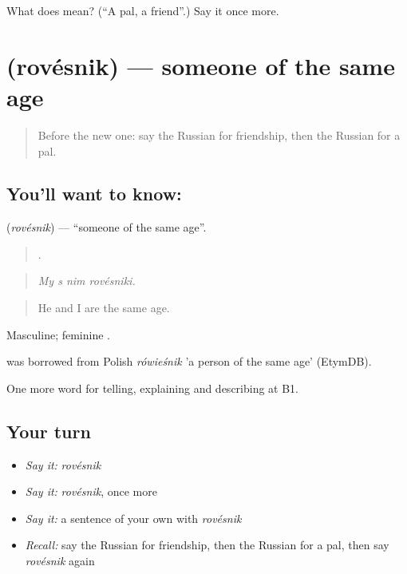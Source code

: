 \begin{tcolorbox}[breakable,colback=teal!4,colframe=teal!35!black,title={Before you move on}]
What does  mean? (\textquotedblleft{}A pal, a friend\textquotedblright{}.) Say it once more.
\end{tcolorbox}
\section[\texorpdfstring{\ru{ровесник} (rovésnik)}{ровесник (rovésnik)}]{ (rovésnik) — someone of the same age}

\label{lesson:RU-C498-rovesnik}



\begin{quote}
Before the new one: say the Russian for friendship, then the Russian for a pal.
\end{quote}

\subsection*{You'll want to know: }
\textbf{} (\emph{rovésnik}) — \textquotedblleft{}someone of the same age\textquotedblright{}.

\begin{quote}
   .
\end{quote}

\begin{quote}
\emph{My s nim rovésniki.}
\end{quote}

\begin{quote}
He and I are the same age.
\end{quote}

Masculine; feminine .

\begin{cousinweb}
\emph{} was borrowed from Polish \emph{rówieśnik} 'a person of the same age' (EtymDB).
\end{cousinweb}

\begin{grammarlens}[title={What you've built}]
One more word for telling, explaining and describing at B1.
\end{grammarlens}

\subsection*{Your turn}
\begin{itemize}
\raggedright
  \item \emph{Say it:} \emph{rovésnik}
  \item \emph{Say it:} \emph{rovésnik}, once more
  \item \emph{Say it:} a sentence of your own with \emph{rovésnik}
  \item \emph{Recall:} say the Russian for friendship, then the Russian for a pal, then say \emph{rovésnik} again
\end{itemize}

